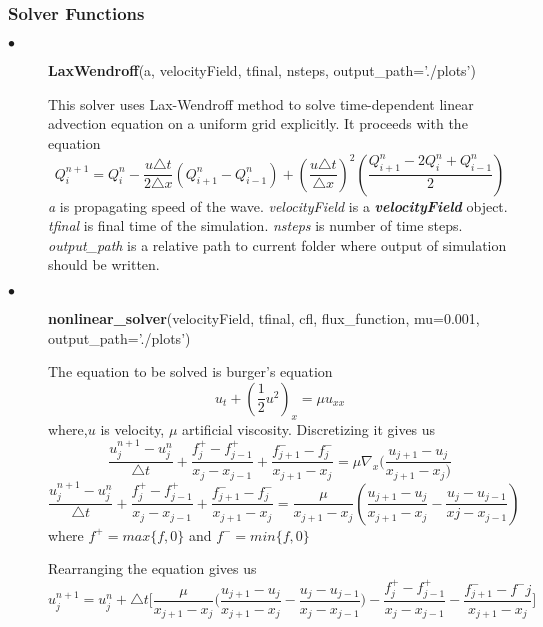 \documentclass[11pt]{article}
\begin{document}
        \subsubsection{Solver Functions}
        \begin{description}
	    \item[$\bullet$]\textbf{LaxWendroff}(a, velocityField, tfinal, nsteps, output\_path='./plots')
                \par
		This solver uses Lax-Wendroff method to solve time-dependent linear advection equation on a uniform grid explicitly.
		It proceeds with the equation
		$$
		Q^{n+1}_i = Q^n_i - \frac{u\triangle t}{2\triangle x}(Q^n_{i+1} - Q^n_{i-1}) + (\frac{u\triangle t}{\triangle x})^2(\frac{Q^n_{i+1}-2Q^n_i+Q^n_{i-1}}{2})
		$$
		\textit{a} is propagating speed of the wave.
		\textit{velocityField} is a \textbf{\textit{velocityField}} object.
		\textit{tfinal} is final time of the simulation.
		\textit{nsteps} is number of time steps.
		\textit{output\_path} is a relative path to current folder where output of simulation should be written. 
	    \item[$\bullet$]\textbf{nonlinear\_solver}(velocityField, tfinal, cfl, flux\_function, mu=0.001, output\_path='./plots')
                \par
		The equation to be solved is burger's equation
		$$
		u_t + (\frac{1}{2}u^2)_x = \mu u_{xx}
		$$
		where,$u$ is velocity, $\mu$ artificial viscosity.
		Discretizing it gives us
		$$
		\frac{u^{n+1}_j-u^n_j}{\triangle t} + \frac{f^+_j-f^+_{j-1}}{x_j-x_{j-1}} + \frac{f^-_{j+1}-f^-_j}{x_{j+1}-x_{j}} = \mu {\nabla}_x (\frac{u_{j+1}-u_{j}}{x_{j+1}-x_j)}
		$$
		$$
		    \frac{u^{n+1}_j-u^n_j}{\triangle t} + \frac{f^+_j-f^+_{j-1}}{x_j-x_{j-1}} + \frac{f^-_{j+1}-f^-_j}{x_{j+1}-x_{j}} = \frac{\mu}{x_{j+1}-x_j}(\frac{u_{j+1}-u_j}{x_{j+1}-x_j}-\frac{u_j-u_{j-1}}{xj-x_{j-1}}) 
		$$
		where $f^+ = max\{f,0\}$ and $f^- = min\{f,0\}$
		\par
		Rearranging the equation gives us
		$$
		u^{n+1}_j = u^n_j + \triangle t \Bigg[\frac{\mu}{x_{j+1}-x_j} \bigg(\frac{u_{j+1}-u_j}{x_{j+1}-x_j}-\frac{u_j-u_{j-1}}{x_j-x_{j-1}}\bigg)-\frac{f^+_j-f^+_{j-1}}{x_j-x_{j-1}} - \frac{f^-_{j+1}-f^-{j}}{x_{j+1}-x_j} \Bigg]
		$$
	\end{description}
\end{document}
